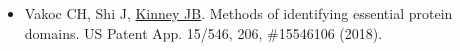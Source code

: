 \documentclass[10pt,hidelinks]{article}
\begin{document}


\begin{itemize}
\item Vakoc CH, Shi J, \underline{Kinney JB}. Methods of identifying essential protein domains. US Patent App. 15/546, 206, \#15546106 (2018).    
\end{itemize}
\,\\
\end{document}
